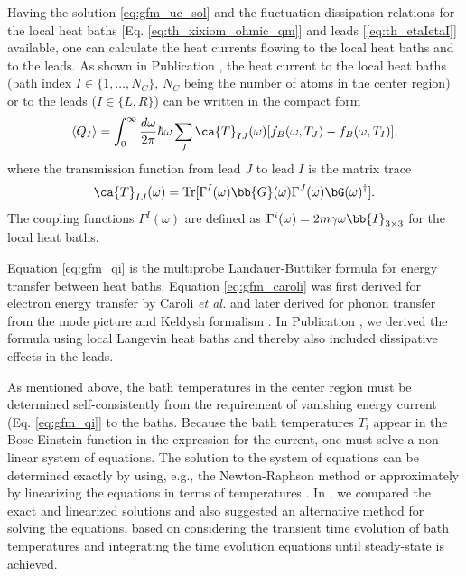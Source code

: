 Having the solution \eqref{eq:gfm_uc_sol} and the fluctuation-dissipation relations for the local heat baths [Eq. \eqref{eq:th_xixiom_ohmic_qm}] and leads [\eqref{eq:th_etaIetaI}] available, one can calculate the heat currents flowing to the local heat baths and to the leads. As shown in Publication , the heat current to the local heat baths (bath index $I\in \{1,\dots,N_C\}$, $N_C$ being the number of atoms in the center region) or to the leads ($I \in \{L,R\}$) can be written in the compact form
\begin{equation}
 \langle Q_I \rangle =  \int_0^{\infty} \frac{d\omega}{2\pi} \hbar \omega \sum_{J} \ca{T}_{IJ}(\omega)[f_B(\omega,T_J)-f_B(\omega,T_I)], \label{eq:gfm_qi}
\end{equation}
where the transmission function from lead $J$ to lead $I$ is the matrix trace 
\begin{equation}
 \ca{T}_{IJ}(\omega) = \textrm{Tr}[\Gamma^I(\omega) \bb{G}(\omega) \Gamma^J(\omega) \bG(\omega)^{\dagger}]. \label{eq:gfm_caroli}
\end{equation}
The coupling functions $\Gamma^I(\omega)$ are defined as $\Gamma^i(\omega)=2m\gamma\omega \bb{I}_{3\times3}$ for the local heat baths.

Equation \eqref{eq:gfm_qi} is the multiprobe Landauer-B\"uttiker formula \cite{buttiker92} for energy transfer between heat baths. Equation \eqref{eq:gfm_caroli} was first derived for electron energy transfer by Caroli \textit{et al.} \cite{caroli71} and later derived for phonon transfer from the mode picture \cite{mingo06} and Keldysh formalism \cite{yamamoto06}. In Publication , we derived the formula using local Langevin heat baths and thereby also included dissipative effects in the leads.

As mentioned above, the bath temperatures in the center region must be determined self-consistently from the requirement of vanishing energy current (Eq. \eqref{eq:gfm_qi}] to the baths. Because the bath temperatures $T_i$ appear in the Bose-Einstein function in the expression for the current, one must solve a non-linear system of equations. The solution to the system of equations can be determined exactly by using, e.g., the Newton-Raphson method \cite{bandyopadhyay11} or approximately by linearizing the equations in terms of temperatures \cite{segal09}. In , we compared the exact and linearized solutions and also suggested an alternative method for solving the equations, based on considering the transient time evolution of bath temperatures and integrating the time evolution equations until steady-state is achieved. 

